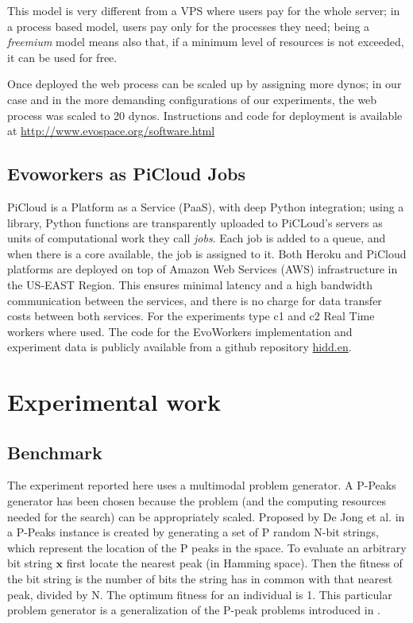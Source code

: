 \documentclass{llncs}
\begin{document}
This model is very different from a VPS where users pay for the
whole server; in a process based model, users pay only for the
processes they need; being a {\em freemium} model means also that, if
a minimum level of resources is not exceeded, it can be used for
free. 

Once deployed the web process can be scaled up by assigning more dynos;
in our case and in the more demanding configurations of our experiments, 
the web process was scaled to 20 dynos. Instructions and code for deployment 
is available at \url{http://www.evospace.org/software.html} %

\subsection{Evoworkers as PiCloud Jobs}
PiCloud is a Platform as a Service (PaaS), with deep Python integration; 
using a library, Python functions are transparently uploaded to PiCLoud's 
servers as units of computational work they call \emph{jobs}. 
Each job is added to a queue, and when there is a core available, 
the job is assigned to it. Both Heroku and PiCloud 
platforms are deployed  on top of Amazon Web Services (AWS) 
infrastructure in the US-EAST Region. This ensures minimal 
latency and a high bandwidth communication between the services, 
and there is no charge for data transfer costs between both services.
For the experiments type c1 and c2 Real Time workers where used.  
The code for the EvoWorkers implementation and experiment data is publicly available 
from a github repository \url{hidd.en}. 

\section{Experimental work}
\label{sec:experiments}
\subsection{Benchmark}
\label{ss:benchmark}
The experiment reported here uses a multimodal problem generator. A P-Peaks generator
has been chosen because the problem (and the computing resources needed for the search) 
can be appropriately scaled. Proposed by De Jong et al. in \cite{Jong:PS97} a
P-Peaks instance is created by generating a set of P random N-bit
strings, which represent the location of the P peaks in the space. To
evaluate an arbitrary bit string \begin{math} \mathbf{x} \end{math}
first locate the nearest peak (in Hamming space). Then the fitness of
the bit string is the number of bits the string has in common with
that nearest peak, divided by N. The optimum fitness for an individual
is 1. This particular problem generator is a generalization of the
P-peak problems introduced in \cite{Jong:1990}.            
\end{document}
